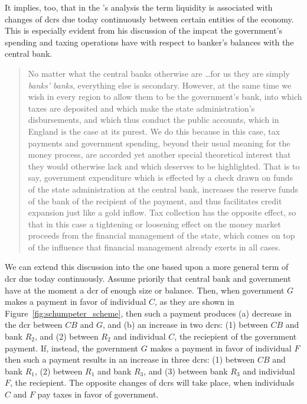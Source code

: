 It implies, too, that in the \citeauthor{schumpeter2014}'s analysis the term liquidity is associated with changes of \acfp{dcr} due today continuously between certain entities of the economy. This is especially evident from his discussion of the impcat the government's spending and taxing operations have with respect to banker's balances with the central bank. 

\begin{quote}
No matter what the central banks otherwise are \dots for us
they are simply \textit{banks' banks}, everything else is secondary. However, at the same time we wish in every region to allow them to be the government's bank, into which taxes are deposited and which make the state administration's
disbursements, and which thus conduct the public accounts, which in England is
the case at its purest. We do this because in this case, tax payments and
government spending, beyond their usual meaning for the money process, are
accorded yet another special theoretical interest that they would otherwise lack
and which deserves to be highlighted. That is to say, government expenditure
which is effected by a check drawn on funds of the state administration at the
central bank, increases the reserve funds of the bank of the recipient of the
payment, and thus facilitates credit expansion just like a gold inflow.
Tax collection has the opposite effect, so that in this case a tightening or loosening
effect on the money market proceeds from the financial management of the
state, which comes on top of the influence that financial management already
exerts in all cases.~\citep[pp.~166-167, emphasis original]{schumpeter2014} 
\end{quote}

We can extend this discussion into the one based upon a more general term of \acf{dcr} due today continuously. Assume priorily that central bank and government have at the moment a \acf{dcr} of enough size or balance. Then, when government $G$ makes a payment in favor of individual $C$, as they are shown in Figure~\ref{fig:schumpeter_scheme}, then such a payment produces (a) decrease in the \ac{dcr} between $CB$ and $G$, and (b) an increase in two \acp{dcr}: (1) between $CB$ and bank $R_2$, and (2) between $R_2$ and individual $C$, the reciepient of the government payment. If, instead, the government $G$ makes a payment in favor of individual $F$ then such a payment results in an increase in three \acp{dcr}: (1) between $CB$ and bank $R_1$, (2) between $R_1$ and bank $R_3$, and (3) between bank $R_3$ and individual $F$, the reciepient. The opposite changes of \acp{dcr} will take place, when individuals $C$ and $F$ pay taxes in favor of government. 

